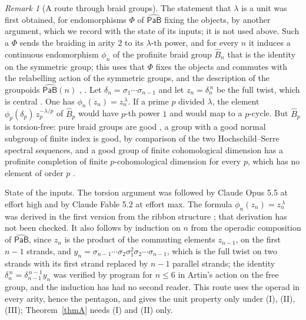 \documentclass[11pt]{amsart}
\theoremstyle{definition}
\theoremstyle{remark}
\newtheorem{remark}[thm]{Remark}
\newcommand{\PaBh}{\widehat{\mathsf{PaB}}}
\begin{document}
\begin{remark}[A route through braid groups]\label{rem:braids}
The statement that $\lambda$ is a unit was first obtained, for endomorphisms $\Phi$ of $\PaBh$ fixing the objects, by another argument, which we record with the state of its inputs; it is not used above. Such a $\Phi$ sends the braiding in arity $2$ to its $\lambda$-th power, and for every $n$ it induces a continuous endomorphism $\phi_n$ of the profinite braid group $\widehat B_n$ that is the identity on the symmetric group; this uses that $\Phi$ fixes the objects and commutes with the relabelling action of the symmetric groups, and the description of the groupoids $\PaBh(n)$ \cite[Definitions~6.2 and~6.11]{BHR}, \cite[Proposition~4.23 and Corollary~4.24]{Hor}. Let $\delta_n=\sigma_1\cdots\sigma_{n-1}$ and let $z_n=\delta_n^{\,n}$ be the full twist, which is central \cite{Ch}. One has $\phi_n(z_n)=z_n^{\,\lambda}$. If a prime $p$ divided $\lambda$, the element $\phi_p(\delta_p)\,z_p^{-\lambda/p}$ of $\widehat B_p$ would have $p$-th power $1$ and would map to a $p$-cycle. But $\widehat B_p$ is torsion-free: pure braid groups are good \cite[Corollary~5.11]{Hor}, a group with a good normal subgroup of finite index is good, by comparison of the two Hochschild--Serre spectral sequences, and a good group of finite cohomological dimension has a profinite completion of finite $p$-cohomological dimension for every $p$, which has no element of order $p$ \cite[Chap.~I, \S\S2.6 and~3.3]{Se}.

State of the inputs. The torsion argument was followed by Claude Opus 5.5 at effort high and by Claude Fable 5.2 at effort max. The formula $\phi_n(z_n)=z_n^{\,\lambda}$ was derived in the first version from the ribbon structure \cite[Definition~6.4, Propositions~7.7 and~8.1]{BHR}; that derivation has not been checked. It also follows by induction on $n$ from the operadic composition of $\PaBh$, since $z_n$ is the product of the commuting elements $z_{n-1}$, on the first $n-1$ strands, and $y_n=\sigma_{n-1}\cdots\sigma_2\sigma_1^2\sigma_2\cdots\sigma_{n-1}$, which is the full twist on two strands with its first strand replaced by $n-1$ parallel strands; the identity $\delta_n^{\,n}=\delta_{n-1}^{\,n-1}y_n$ was verified by program for $n\le6$ in Artin's action on the free group, and the induction has had no second reader. This route uses the operad in every arity, hence the pentagon, and gives the unit property only under (I), (II), (III); Theorem~\ref{thmA} needs (I) and (II) only.
\end{remark}
\end{document}
